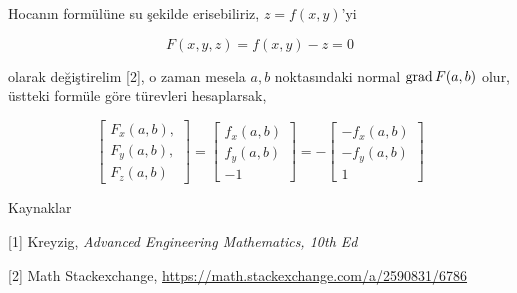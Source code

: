 \documentclass[12pt,fleqn]{article}\usepackage{../../common}
\begin{document}
Hocanın formülüne su şekilde erisebiliriz, $z = f(x,y)$'yi

$$
F(x,y,z) = f(x,y) - z = 0
$$

olarak değiştirelim [2], o zaman mesela $a,b$ noktasındaki normal $\operatorname{grad} F(a,b)$
olur, üstteki formüle göre türevleri hesaplarsak,

$$
\left[\begin{array}{c}
F_x(a,b), \\ F_y(a,b), \\F_z(a,b)
\end{array}\right]
=
\left[\begin{array}{c}
f_x(a,b) \\
f_y(a,b) \\
-1
\end{array}\right]
= - \left[\begin{array}{c}
-f_x(a,b) \\
-f_y(a,b) \\
1
\end{array}\right]
$$

Kaynaklar

[1] Kreyzig, {\em Advanced Engineering Mathematics, 10th Ed}

[2] Math Stackexchange, \url{https://math.stackexchange.com/a/2590831/6786}
\end{document}
